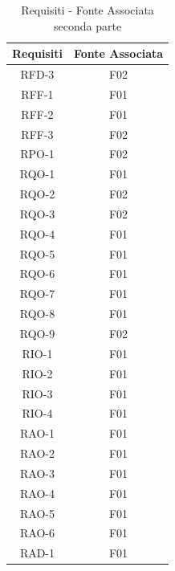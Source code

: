 \begin{table}[h]
\begin{center}
     \begin{tabular}
           {@{\extracolsep{\fill}}|c|c|}
     \hline
      \textbf{Requisiti} & \textbf{Fonte Associata} \\
     \hline
     RFD-3 & F02 \\
     \hline
     RFF-1 & F01 \\
     \hline
     RFF-2 & F01 \\
     \hline
     RFF-3 & F02 \\
     \hline
     RPO-1 & F02 \\
     \hline
     RQO-1 & F01 \\
     \hline
     RQO-2 & F02 \\
     \hline
     RQO-3 & F02 \\
     \hline
     RQO-4 & F01 \\
     \hline
     RQO-5 & F01 \\
     \hline
     RQO-6 & F01 \\
     \hline
     RQO-7 & F01 \\
     \hline
     RQO-8 & F01 \\
     \hline
     RQO-9 & F02 \\
     \hline
     RIO-1 & F01 \\
     \hline
     RIO-2 & F01 \\
     \hline
     RIO-3 & F01 \\
     \hline
     RIO-4 & F01 \\
     \hline
     RAO-1 & F01 \\
     \hline
     RAO-2 & F01 \\
     \hline
     RAO-3 & F01 \\
     \hline
     RAO-4 & F01 \\
     \hline
     RAO-5 & F01 \\
     \hline
     RAO-6 & F01 \\
     \hline
     RAD-1 & F01 \\
    \hline %
    \end{tabular}
  \caption{Requisiti - Fonte Associata seconda parte} %
  \label{tab:reqfonte2}
  \end{center}
\end{table}

